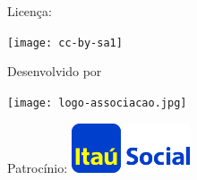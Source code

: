 \begin{figure}[b]
\begin{minipage}[l]{5cm}
\centering

{\large Licença:}

  \texttt{[image: cc-by-sa1]}
\end{minipage}\hfill
\begin{minipage}[c]{5cm}
\centering
{\large Desenvolvido por}

\texttt{[image: logo-associacao.jpg]}
\end{minipage}
\begin{minipage}[r]{5cm}
\centering

{\large Patrocínio:}
  \vspace{1em}
  \includegraphics[width=3.5cm]{itau}
\end{minipage}
\end{figure}

\mainmatter


